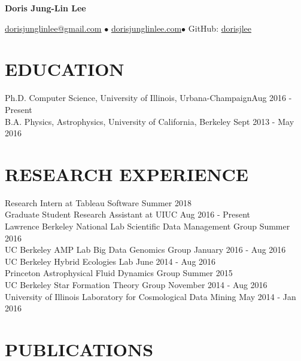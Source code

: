 \documentclass{res}
\newcommand{\rfill}{\hspace*{\fill}}
\begin{document}
\raggedright
\centerline{\LARGE \textbf{Doris Jung-Lin Lee}} 
\vspace{-10pt}
\noindent %
\centerline{ \href{mailto:dorisjunglinlee@gmail.com}{dorisjunglinlee@gmail.com} $\bullet$
\href{http://dorisjunglinlee.com}{dorisjunglinlee.com}$\bullet$
 GitHub: \href{https://github.com/dorisjlee}{dorisjlee} }
\vspace{1pt}
 \vspace{5pt}
\begin{resume}
\vspace{-30pt}
\section{EDUCATION}
\vspace{5pt}Ph.D. Computer Science, University of Illinois, Urbana-Champaign\rfill Aug 2016 - Present
\\\vspace{5pt}B.A. Physics, Astrophysics, University of California, Berkeley \rfill Sept 2013 - May 2016
\vspace{-2pt}
\section{RESEARCH EXPERIENCE}
\vspace{2pt}
Research Intern at Tableau Software \rfill Summer 2018 \\
Graduate Student Research Assistant at UIUC \rfill Aug 2016 - Present \\ 
Lawrence Berkeley National Lab Scientific Data Management Group \rfill Summer 2016 \\
UC Berkeley AMP Lab Big Data Genomics Group \rfill January 2016 - Aug 2016 \\
UC Berkeley Hybrid Ecologies Lab \rfill  June 2014 - Aug 2016\\
Princeton Astrophysical Fluid Dynamics Group \rfill Summer 2015 \\
UC Berkeley Star Formation Theory Group \rfill November 2014 - Aug 2016 \\
University of Illinois Laboratory for Cosmological Data Mining \rfill May 2014 - Jan 2016 
\section{PUBLICATIONS}
\vspace{-5pt}

\end{resume}
\end{document}
